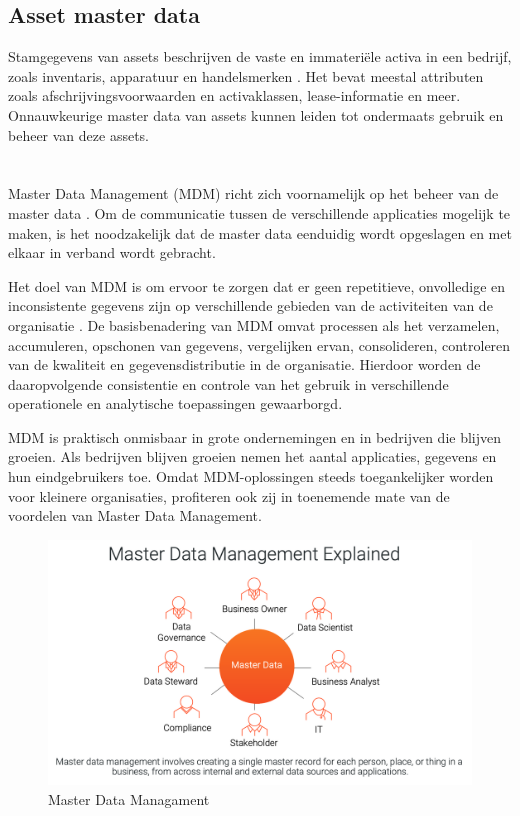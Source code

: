 \subsection{Asset master data}
Stamgegevens van assets beschrijven de vaste en immateriële activa in een bedrijf, zoals inventaris, apparatuur en handelsmerken \autocite{SAPMasterData}. Het bevat meestal attributen zoals afschrijvingsvoorwaarden en activaklassen, lease-informatie en meer. Onnauwkeurige master data van assets kunnen leiden tot ondermaats gebruik en beheer van deze assets.

\section{}%
\label{sec:mdm}
Master Data Management (MDM) richt zich voornamelijk op het beheer van de master data \autocite{Martins2022}. Om de communicatie tussen de verschillende applicaties mogelijk te maken, is het noodzakelijk dat de master data eenduidig wordt opgeslagen en met elkaar in verband wordt gebracht. 

Het doel van MDM is om ervoor te zorgen dat er geen repetitieve, onvolledige en inconsistente gegevens zijn op verschillende gebieden van de activiteiten van de organisatie \autocite{Prokhorov2018}. De basisbenadering van MDM omvat processen als het verzamelen, accumuleren, opschonen van gegevens, vergelijken ervan, consolideren, controleren van de kwaliteit en gegevensdistributie in de organisatie. Hierdoor worden de daaropvolgende consistentie en controle van het gebruik in verschillende operationele en analytische toepassingen gewaarborgd.

MDM is praktisch onmisbaar in grote ondernemingen en in bedrijven die blijven groeien. Als bedrijven blijven groeien nemen het aantal applicaties, gegevens en hun eindgebruikers toe. Omdat MDM-oplossingen steeds toegankelijker worden voor kleinere organisaties, profiteren ook zij in toenemende mate van de voordelen van Master Data Management.

\begin{figure}[htbp]
  \centering
  \includegraphics[scale=0.2]{../images/MasterData.png}
  \caption{Master Data Managament}
\end{figure}

